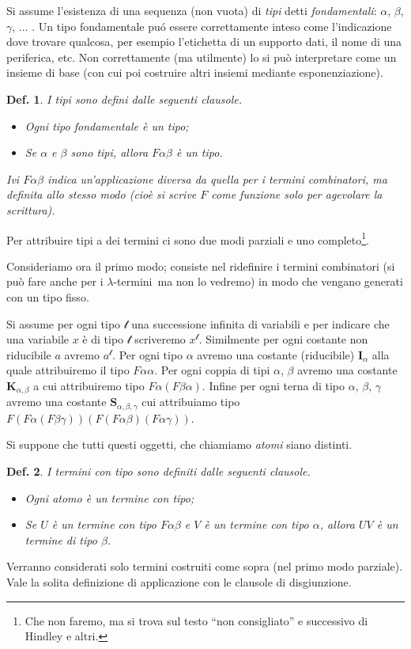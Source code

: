 \documentclass{book}
\newtheorem{definizione}{Def.}[chapter]
\newcommand*{\ii}{\mathbf{I}}    %
\newcommand*{\kk}{\mathbf{K}}    %
\newcommand*{\sss}{\mathbf{S}}   %
\newcommand*{\lbts}{$\lambda$-ter\-mi\-ni}
\begin{document}
Si assume l'esistenza di una sequenza (non vuota) di \emph{tipi} detti \emph{
fondamentali}: $\alpha$, $\beta$, $\gamma$, $\ldots$ . Un tipo fondamentale 
pu\'o essere correttamente inteso come l'indicazione dove trovare qualcosa, per
esempio l'etichetta di un supporto dati, il nome di una periferica, etc.
Non correttamente (ma utilmente) lo si pu\`o interpretare come un insieme di 
base (con cui poi costruire altri insiemi mediante esponenziazione).

\begin{definizione}
I tipi sono defini dalle seguenti clausole.
\begin{itemize}
\item[-]Ogni tipo fondamentale \`e un tipo;
\item[-]Se $\alpha$ e $\beta$ sono tipi, allora $F\alpha\beta$ \`e un tipo.
\end{itemize}
Ivi $F\alpha\beta$ indica un'applicazione diversa da quella per i termini 
combinatori, ma definita allo stesso modo (cio\`e si scrive $F$ come funzione
solo per agevolare la scrittura).
\end{definizione}
Per attribuire tipi a dei termini ci sono due modi parziali e uno 
completo\footnote{Che non faremo, ma si trova sul testo ``non consigliato'' e
successivo di Hindley e altri.}. 

Consideriamo ora il primo modo; consiste nel ridefinire i termini combinatori
(si pu\`o fare anche per i \lbts~ma non lo vedremo) in modo che vengano 
generati con un tipo fisso.

Si assume per ogni tipo $\mathcal{t}$ una successione infinita di variabili
e per indicare che una variabile $x$ \`e di tipo $\mathcal{t}$ scriveremo
$x^\mathcal{t}$. Similmente per ogni costante non riducibile $a$ avremo 
$a^\mathcal{t}$. Per ogni tipo $\alpha$ avremo una costante (riducibile) 
$\ii_\alpha$ alla quale attribuiremo il tipo $F\alpha\alpha$. Per ogni coppia
di tipi $\alpha$, $\beta$ avremo una costante $\kk_{\alpha,\beta}$ a cui
attribuiremo tipo $F\alpha(F\beta\alpha)$. Infine per ogni terna di tipo
$\alpha$, $\beta$, $\gamma$ avremo una costante $\sss_{\alpha,\beta,\gamma}$ 
cui attribuiamo tipo 
$F(F\alpha(F\beta\gamma))(F(F\alpha\beta)(F\alpha\gamma))$.

Si suppone che tutti questi oggetti, che chiamiamo \emph{atomi} siano distinti.

\begin{definizione}
I termini con tipo sono definiti dalle seguenti clausole.
\begin{itemize}
\item[-]Ogni atomo \`e un termine con tipo;
\item[-]Se $U$ \`e un termine con tipo $F\alpha\beta$ e $V$ \`e un termine con
tipo $\alpha$, allora $UV$ \`e un termine di tipo $\beta$.
\end{itemize}
\end{definizione}
Verranno considerati solo termini costruiti come sopra (nel primo modo 
par\-zia\-le). Vale la solita definizione di applicazione con le clausole di
disgiunzione.
\end{document}
